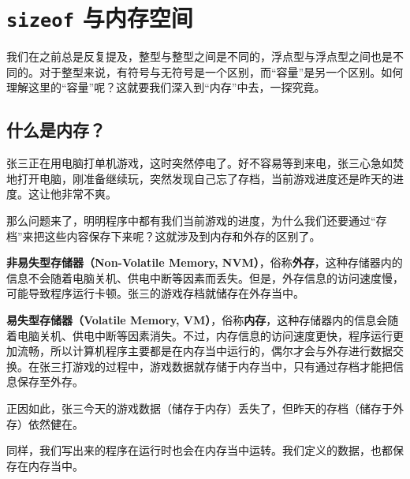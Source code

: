 \section{\texttt{sizeof} 与内存空间}
我们在之前总是反复提及，整型与整型之间是不同的，浮点型与浮点型之间也是不同的。对于整型来说，有符号与无符号是一个区别，而``容量''是另一个区别。如何理解这里的``容量''呢？这就要我们深入到``内存''中去，一探究竟。\par
\subsection*{什么是内存？}
张三正在用电脑打单机游戏，这时突然停电了。好不容易等到来电，张三心急如焚地打开电脑，刚准备继续玩，突然发现自己忘了存档，当前游戏进度还是昨天的进度。这让他非常不爽。\par
那么问题来了，明明程序中都有我们当前游戏的进度，为什么我们还要通过``存档''来把这些内容保存下来呢？这就涉及到内存和外存的区别了。\par
\textbf{非易失型存储器（Non-Volatile Memory, NVM）}，俗称\textbf{外存}，这种存储器内的信息不会随着电脑关机、供电中断等因素而丢失。但是，外存信息的访问速度慢，可能导致程序运行卡顿。张三的游戏存档就储存在外存当中。\par
\textbf{易失型存储器（Volatile Memory, VM）}，俗称\textbf{内存}，这种存储器内的信息会随着电脑关机、供电中断等因素消失。不过，内存信息的访问速度更快，程序运行更加流畅，所以计算机程序主要都是在内存当中运行的，偶尔才会与外存进行数据交换。在张三打游戏的过程中，游戏数据就存储于内存当中，只有通过存档才能把信息保存至外存。\par
正因如此，张三今天的游戏数据（储存于内存）丢失了，但昨天的存档（储存于外存）依然健在。\par
同样，我们写出来的程序在运行时也会在内存当中运转。我们定义的数据，也都保存在内存当中。\par
